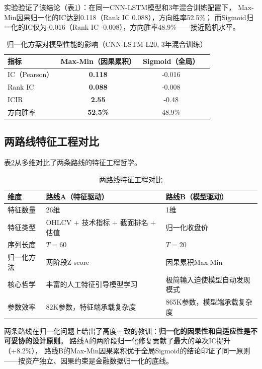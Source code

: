 \documentclass[12pt,a4paper]{ctexart}
\begin{document}
实验验证了该结论（表\ref{tab:sigmoid_vs_maxmin}）：在同一CNN-LSTM模型和3年混合训练配置下，
Max-Min因果归一化的IC达到0.118（Rank IC 0.088），方向胜率52.5\%；
而Sigmoid归一化的IC仅为-0.016（Rank IC -0.008），方向胜率48.9\%——接近随机水平。

\begin{table}[htbp]
\centering
\caption{归一化方案对模型性能的影响（CNN-LSTM L20, 3年混合训练）}
\label{tab:sigmoid_vs_maxmin}
\begin{tabular}{lccc}
\toprule
指标 & Max-Min（因果累积） & Sigmoid（全局） \\
\midrule
IC（Pearson） & \textbf{0.118} & -0.016 \\
Rank IC & \textbf{0.088} & -0.008 \\
ICIR & \textbf{2.55} & -0.48 \\
方向胜率 & \textbf{52.5\%} & 48.9\% \\
\bottomrule
\end{tabular}
\end{table}

\subsection{两路线特征工程对比}

表\ref{tab:feature_compare}从多维对比了两条路线的特征工程哲学。

\begin{table}[htbp]
\centering
\caption{两路线特征工程对比}
\label{tab:feature_compare}
\begin{tabular}{p{3cm}p{4cm}p{4cm}}
\toprule
维度 & 路线A（特征驱动） & 路线B（模型驱动） \\
\midrule
特征数量 & 26维 & 1维 \\
特征类型 & OHLCV + 技术指标 + 截面排名 + 估值 & 归一化收盘价 \\
序列长度 & $T=60$ & $T=20$ \\
归一化方法 & 两阶段Z-score & 因果累积Max-Min \\
核心哲学 & 丰富的人工特征引导模型学习 & 极简输入迫使模型自动发现模式 \\
参数效率 & 82K参数，特征端承载复杂度 & 865K参数，模型端承载复杂度 \\
\bottomrule
\end{tabular}
\end{table}

两条路线在归一化问题上给出了高度一致的教训：\textbf{归一化的因果性和自适应性是不可妥协的设计原则}。
路线A的两阶段归一化修复贡献了最大的单次IC提升（+8.2\%），
路线B的Max-Min因果累积优于全局Sigmoid的结论印证了同一原则——按资产独立、因果约束是金融数据归一化的底线。
\end{document}
